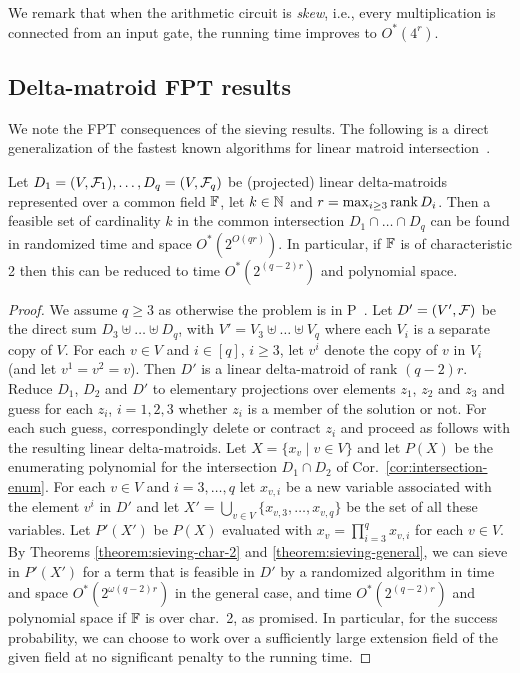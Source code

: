 We remark that when the arithmetic circuit is \emph{skew}, i.e., every multiplication is connected from an input gate, the running time improves to $O^*(4^r)$.

\subsection{Delta-matroid FPT results}
\label{sec:dm-part1-fpt}

We note the FPT consequences of the sieving results. The following is
a direct generalization of the fastest known algorithms for linear
matroid intersection~\cite{EKW23}. 

\begin{lemma} \label{lm:ddd-intersection}
  Let $D_1=(V,\mathcal F_1), \ldots, D_q=(V,\mathcal F_q)$ be (projected) linear delta-matroids represented over a common field $\mathbb F$,
  let $k \in \mathbb N$ and $r=\max_{i \geq 3} \operatorname{rank} D_i$. Then a feasible set of cardinality $k$
  in the common intersection $D_1 \cap \ldots \cap D_q$ can be found in randomized time and space $O^*(2^{O(qr)})$.
  In particular, if $\mathbb F$ is of characteristic 2 then this can be reduced to time $O^*(2^{(q-2)r})$ and polynomial space. 
\end{lemma}
\begin{proof}
  We assume $q \geq 3$ as otherwise the problem is in P~\cite{GeelenIM03,KW24}.
  Let $D'=(V',\mathcal F)$ be the direct sum $D_3 \uplus \ldots \uplus D_q$, with
  $V'=V_3 \uplus \ldots \uplus V_q$ where each $V_i$ is a separate copy of $V$. 
  For each $v \in V$ and $i \in [q]$, $i \geq 3$, let $v^i$ denote the copy of $v$ in $V_i$ (and let $v^1=v^2=v$). 
  Then $D'$ is a linear delta-matroid of rank $(q-2)r$.
  Reduce $D_1$, $D_2$ and $D'$ to elementary projections over elements $z_1$, $z_2$ and $z_3$
  and guess for each $z_i$, $i=1, 2, 3$ whether $z_i$ is a member of the solution or not.
  For each such guess, correspondingly delete or contract $z_i$ and proceed as follows
  with the resulting linear delta-matroids. 
  Let $X=\{x_v \mid v \in V\}$ and let $P(X)$ be the enumerating polynomial for the intersection $D_1 \cap D_2$ of Cor.~\ref{cor:intersection-enum}.
  For each $v \in V$ and $i=3, \ldots, q$ let $x_{v,i}$ be a new variable associated with the element $v^i$ in $D'$
  and let $X'=\bigcup_{v \in V} \{x_{v,3}, \ldots, x_{v,q}\}$ be the set of all these variables.
  Let $P'(X')$ be $P(X)$ evaluated with $x_v=\prod_{i=3}^q x_{v,i}$ for each $v \in V$.
  By Theorems \ref{theorem:sieving-char-2} and \ref{theorem:sieving-general}, we can sieve in $P'(X')$ for a term that is feasible in $D'$
  by a randomized algorithm
  in time and space $O^*(2^{\omega (q-2)r})$ in the general case, and time $O^*(2^{(q-2)r})$ and polynomial space
  if $\mathbb F$ is over char.~2, as promised. In particular, for the success probability, 
  we can choose to work over a sufficiently large extension field
  of the given field at no significant penalty to the running time.
\end{proof}

